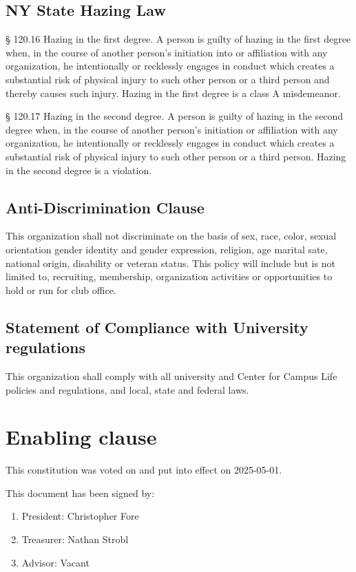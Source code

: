 \documentclass[a4paper]{article}
\begin{document}
\subsection{NY State Hazing Law}
\begin{subroutines}
    \item § 120.16 Hazing in the first degree. A person is guilty of hazing in the first degree when, in the course of another person's initiation into or affiliation with any organization, he intentionally or recklessly engages in conduct which creates a substantial risk of physical injury to such other person or a third person and thereby causes such injury. Hazing in the first degree is a class A misdemeanor.
    \item § 120.17 Hazing in the second degree. A person is guilty of hazing in the second degree when, in the course of another person's initiation or affiliation with any organization, he intentionally or recklessly engages in conduct which creates a substantial risk of physical injury to such other person or a third person. Hazing in the second degree is a violation.
\end{subroutines}
\subsection{Anti-Discrimination Clause}
\begin{subroutines}
    \item This organization shall not discriminate on the basis of sex, race, color, sexual orientation gender identity and gender expression, religion, age marital sate, national origin, disability or veteran status. This policy will include but is not limited to, recruiting, membership, organization activities or opportunities to hold or run for club office.
\end{subroutines}
\subsection{Statement of Compliance with University regulations}
\begin{subroutines}
    \item This organization shall comply with all university and Center for Campus Life policies and regulations, and local, state and federal laws.
\end{subroutines}

\section{Enabling clause}
\begin{subroutines}
    \item This constitution was voted on and put into effect on 2025-05-01.
    \item This document has been signed by:
    \begin{enumerate}
        \item President: Christopher Fore
        \item Treasurer: Nathan Strobl
        \item Advisor: Vacant
        \end{enumerate}
\end{subroutines}
\end{document}
